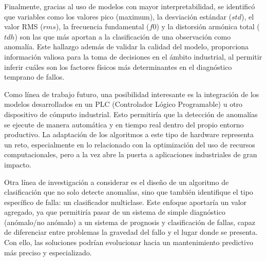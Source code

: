 \documentclass[11pt,a4paper,spanish]{book}
\numberwithin{equation}{chapter}
\numberwithin{figure}{chapter}
\begin{document}
Finalmente, gracias al uso de modelos con mayor interpretabilidad, se identificó que 
variables como los valores pico (maximum), la desviación estándar ($std$), el valor RMS ($rms$),
la frecuencia fundamental ($f0$) y la distorsión armónica total ($tdh$) son las que más 
aportan a la clasificación de una observación como anomalía. Este hallazgo  además de 
validar la calidad del modelo, proporciona información valiosa para la toma de 
decisiones en el ámbito industrial, al permitir inferir cuáles son los factores físicos
más determinantes en el diagnóstico temprano de fallos.


Como línea de trabajo futuro, una posibilidad interesante es la integración de los 
modelos desarrollados en un PLC (Controlador Lógico Programable) u otro dispositivo
de cómputo industrial. Esto permitiría que la detección de anomalías se ejecute de 
manera automática y en tiempo real dentro del propio entorno productivo. La adaptación
de los algoritmos a este tipo de hardware representa un reto, especialmente en lo 
relacionado con la optimización del uso de recursos computacionales, pero a la vez abre
la puerta a aplicaciones industriales de gran impacto.


Otra línea de investigación a considerar es el diseño de un algoritmo de clasificación
que no solo detecte anomalías, sino que también identifique el tipo específico de falla:
un clasificador multiclase.  Este enfoque aportaría un valor agregado, ya que permitiría
pasar de un sistema de simple diagnóstico (anómalo/no anómalo) a un sistema de prognosis
y clasificación de fallas, capaz de diferenciar entre problemas la gravedad del fallo y 
el lugar donde se presenta. Con ello, las soluciones podrían evolucionar hacia un 
mantenimiento predictivo más preciso y especializado.






\end{document}
